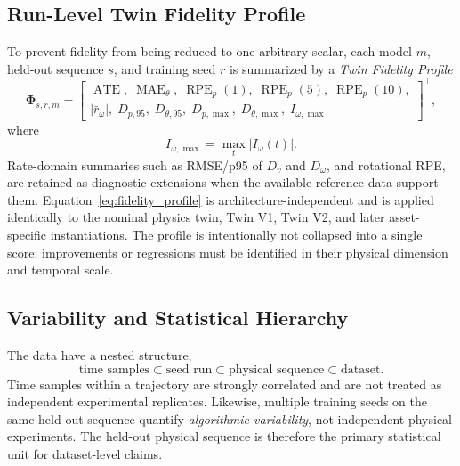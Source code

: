 \documentclass[conference]{IEEEtran}
\newcommand{\Dv}{D_{v}}
\newcommand{\Domega}{D_{\omega}}
\newcommand{\Iomega}{I_{\omega}}
\begin{document}
\subsection{Run-Level Twin Fidelity Profile}
To prevent fidelity from being reduced to one arbitrary scalar, each model $m$, held-out sequence $s$, and training seed $r$ is summarized by a \emph{Twin Fidelity Profile}
\begin{equation}
\boldsymbol{\Phi}_{s,r,m}=
\left[
\begin{array}{c}
\operatorname{ATE},\;
\operatorname{MAE}_{\theta},\;
\operatorname{RPE}_{p}(1),\;
\operatorname{RPE}_{p}(5),\;
\operatorname{RPE}_{p}(10),\\
|\bar r_{\omega}|,\;
D_{p,95},\;
D_{\theta,95},\;
D_{p,\max},\;
D_{\theta,\max},\;
I_{\omega,\max}
\end{array}
\right]^{\top},
\label{eq:fidelity_profile}
\end{equation}
where
\begin{equation}
I_{\omega,\max}=\max_t|\Iomega(t)|.
\end{equation}
Rate-domain summaries such as RMSE/p95 of $\Dv$ and $\Domega$, and rotational RPE, are retained as diagnostic extensions when the available reference data support them. Equation~\eqref{eq:fidelity_profile} is architecture-independent and is applied identically to the nominal physics twin, Twin V1, Twin V2, and later asset-specific instantiations. The profile is intentionally not collapsed into a single score; improvements or regressions must be identified in their physical dimension and temporal scale.

\subsection{Variability and Statistical Hierarchy}
The data have a nested structure,
\begin{equation}
\text{time samples}\subset\text{seed run}\subset\text{physical sequence}\subset\text{dataset}.
\label{eq:hierarchy}
\end{equation}
Time samples within a trajectory are strongly correlated and are not treated as independent experimental replicates. Likewise, multiple training seeds on the same held-out sequence quantify \emph{algorithmic variability}, not independent physical experiments. The held-out physical sequence is therefore the primary statistical unit for dataset-level claims.
\end{document}
